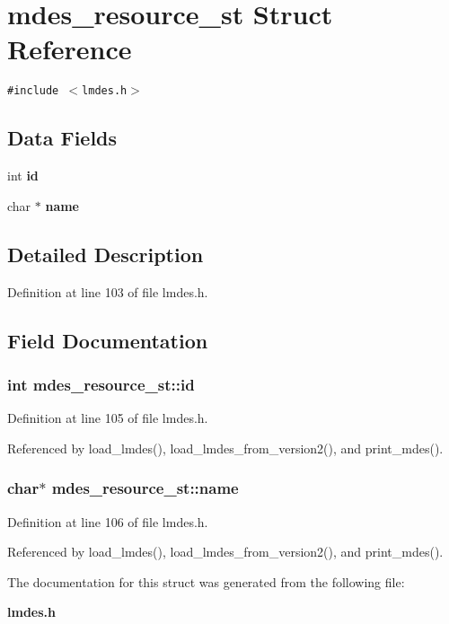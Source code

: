 \section{mdes\_\-resource\_\-st Struct Reference}
\label{structmdes__resource__st}
{\tt \#include $<$lmdes.h$>$}

\subsection*{Data Fields}
\begin{CompactItemize}
\item 
int \bf{id}
\item 
char $\ast$ \bf{name}
\end{CompactItemize}


\subsection{Detailed Description}




Definition at line 103 of file lmdes.h.

\subsection{Field Documentation}
\subsubsection{\setlength{\rightskip}{0pt plus 5cm}int \bf{mdes\_\-resource\_\-st::id}}\label{structmdes__resource__st_42ca120f2786441b8b222381866e31d3}




Definition at line 105 of file lmdes.h.

Referenced by load\_\-lmdes(), load\_\-lmdes\_\-from\_\-version2(), and print\_\-mdes().
\subsubsection{\setlength{\rightskip}{0pt plus 5cm}char$\ast$ \bf{mdes\_\-resource\_\-st::name}}\label{structmdes__resource__st_c10bb6f8306bf22abe165ba9f07139c7}




Definition at line 106 of file lmdes.h.

Referenced by load\_\-lmdes(), load\_\-lmdes\_\-from\_\-version2(), and print\_\-mdes().

The documentation for this struct was generated from the following file:\begin{CompactItemize}
\item 
\bf{lmdes.h}\end{CompactItemize}
